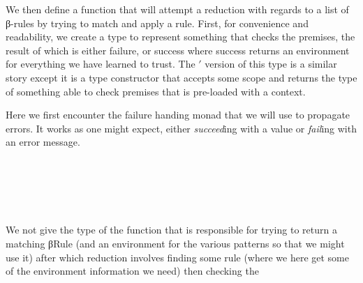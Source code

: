 We then define a function that will attempt a reduction with regards
to a list of β-rules by trying to match and apply a rule. First, for
convenience and readability, we create a type to represent something
that checks the premises, the result of which is either failure, or
success where success returns an environment for everything we have
learned to trust. The $'$ version of this type is a similar story
except it is a type constructor that accepts some scope and returns
the type of something able to check premises that is pre-loaded with
a context.

Here we first encounter the failure handing monad that we will use to
propagate errors. It works as one might expect, either \emph{succeed}ing
with a value or \emph{fail}ing with an error message.
\begin{code}%
\>[0]\AgdaSpace{}%
\AgdaSymbol{=}%
\>[16]\AgdaSymbol{\}}\AgdaSpace{}%
\AgdaSpace{}%
\AgdaSpace{}%
%
\>[41]\<%
\\
%
\>[16]\AgdaSymbol{\{}\AgdaSpace{}%
\AgdaSpace{}%
\AgdaSpace{}%
\AgdaSymbol{:}\AgdaSpace{}%
\AgdaSpace{}%
\AgdaSymbol{\}}%
\>[41]\<%
\\
%
\>[16]\AgdaSpace{}%
\AgdaSpace{}%
\AgdaSpace{}%
\AgdaSpace{}%
%
\>[41]\<%
\\
%
\>[16]\AgdaSpace{}%
\AgdaSpace{}%
\AgdaSpace{}%
%
\>[41]\<%
\\
%
\>[16]\AgdaSpace{}%
\AgdaSymbol{(}\AgdaSpace{}%
\AgdaSymbol{)}\<%
\end{code}
We not give the type of the function that is responsible for trying to
return a matching βRule (and an environment for the various patterns so
that we might use it) after which reduction involves finding some rule (where
we here get some of the environment information we need) then checking the
